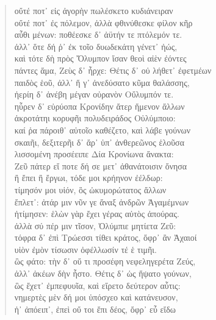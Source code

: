 \begin{Spacing}{1.5}
\begin{verse}
{\large\g οὔτέ ποτ᾽ εἰς ἀγορὴν πωλέσκετο κυδιάνειραν  } \\
{\large\g οὔτέ ποτ᾽ ἐς πόλεμον, ἀλλὰ φθινύθεσκε φίλον κῆρ  } \\
{\large\g αὖθι μένων: ποθέεσκε δ᾽ ἀϋτήν τε πτόλεμόν τε.  } \\
{\large\g ἀλλ᾽ ὅτε δή ῥ᾽ ἐκ τοῖο δυωδεκάτη γένετ᾽ ἠώς,  } \\
{\large\g καὶ τότε δὴ πρὸς Ὄλυμπον ἴσαν θεοὶ αἰὲν ἐόντες  } \\
{\large\g πάντες ἅμα, Ζεὺς δ᾽ ἦρχε: Θέτις δ᾽ οὐ λήθετ᾽ ἐφετμέων  } \\
{\large\g παιδὸς ἑοῦ, ἀλλ᾽ ἥ γ᾽ ἀνεδύσατο κῦμα θαλάσσης,  } \\
{\large\g ἠερίη δ᾽ ἀνέβη μέγαν οὐρανὸν Οὔλυμπόν τε.  } \\
{\large\g ηὗρεν δ᾽ εὐρύοπα Κρονίδην ἄτερ ἥμενον ἄλλων  } \\
{\large\g ἀκροτάτηι κορυφῆι πολυδειράδος Οὐλύμποιο:  } \\
{\large\g καί ῥα πάροιθ᾽ αὐτοῖο καθέζετο, καὶ λάβε γούνων  } \\
{\large\g σκαιῆι, δεξιτερῆι δ᾽ ἄρ᾽ ὑπ᾽ ἀνθερεῶνος ἑλοῦσα  } \\
{\large\g λισσομένη προσέειπε Δία Κρονίωνα ἄνακτα:  } \\
{\large\g Ζεῦ πάτερ εἴ ποτε δή σε μετ᾽ ἀθανάτοισιν ὄνησα  } \\
{\large\g ἢ ἔπει ἢ ἔργωι, τόδε μοι κρήηνον ἐέλδωρ:  } \\
{\large\g τίμησόν μοι υἱόν, ὃς ὠκυμορώτατος ἄλλων  } \\
{\large\g ἔπλετ᾽: ἀτάρ μιν νῦν γε ἄναξ ἀνδρῶν Ἀγαμέμνων  } \\
{\large\g ἠτίμησεν: ἑλὼν γὰρ ἔχει γέρας αὐτὸς ἀπούρας.  } \\
{\large\g ἀλλὰ σύ πέρ μιν τῖσον, Ὀλύμπιε μητίετα Ζεῦ:  } \\
{\large\g τόφρα δ᾽ ἐπὶ Τρώεσσι τίθει κράτος, ὄφρ᾽ ἂν Ἀχαιοί  } \\
{\large\g υἱὸν ἐμὸν τίσωσιν ὀφέλλωσίν τέ ἑ τιμῆι.  } \\
{\large\g ὣς φάτο: τὴν δ᾽ οὔ τι προσέφη νεφεληγερέτα Ζεύς,  } \\
{\large\g ἀλλ᾽ ἀκέων δὴν ἧστο. Θέτις δ᾽ ὡς ἥψατο γούνων,  } \\
{\large\g ὣς ἔχετ᾽ ἐμπεφυυῖα, καὶ εἴρετο δεύτερον αὖτις:  } \\
{\large\g νημερτὲς μὲν δή μοι ὑπόσχεο καὶ κατάνευσον,  } \\
{\large\g ἠ᾽ ἀπόειπ᾽, ἐπεὶ οὔ τοι ἔπι δέος, ὄφρ᾽ εὖ εἴδω  } \\

\end{verse}
\end{Spacing}

